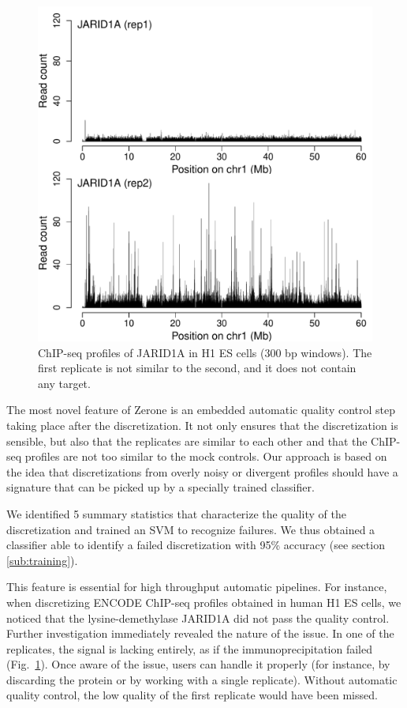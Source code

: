 \documentclass{bioinfo}
\begin{document}
\begin{figure}[!tpb]
\centerline{\includegraphics[scale=0.5]{jarid.pdf}}
\caption{
  ChIP-seq profiles of JARID1A in H1 ES cells (300 bp windows).
  The first replicate is not similar to the second, and it does not
  contain any target.
}\label{fig:jarid}
\end{figure}

The most novel feature of Zerone is an embedded automatic quality
control step taking place after the discretization. It not only
ensures that the discretization is sensible, but also that the
replicates are similar to each other and that the ChIP-seq profiles
are not too similar to the mock controls. Our approach is based
on the idea that discretizations from overly noisy or
divergent profiles should have a signature that
can be picked up by a specially trained classifier.

We identified 5 summary statistics that characterize the quality of
the discretization and trained an SVM to recognize failures. We thus
obtained a classifier able to identify a failed discretization with
95\% accuracy (see section \ref{sub:training}).

This feature is essential for high throughput automatic pipelines.
For instance, when discretizing ENCODE ChIP-seq profiles obtained in
human H1 ES cells, we noticed that the lysine-demethylase JARID1A did
not pass the quality control.
Further investigation immediately revealed the nature of the issue.
In one of the replicates, the signal is lacking entirely, as if
the immunoprecipitation failed (Fig.~\ref{fig:jarid}).
Once aware of the issue, users can handle it properly (for instance,
by discarding the protein or by working with a single replicate).
Without automatic quality control, the low quality of the first replicate
would have been missed.
\end{document}
